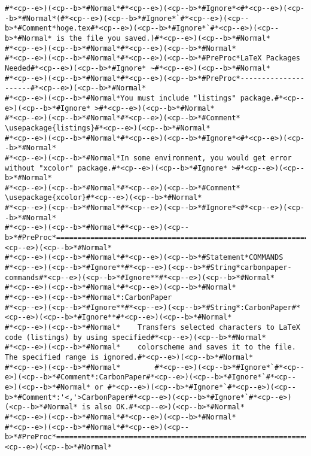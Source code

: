 \begin{lstlisting}[style=carbonpaper]
#*<cp--e>)(<cp--b>*#Normal*#*<cp--e>)(<cp--b>*#Ignore*<#*<cp--e>)(<cp--b>*#Normal*(#*<cp--e>)(<cp--b>*#Ignore*`#*<cp--e>)(<cp--b>*#Comment*hoge.tex#*<cp--e>)(<cp--b>*#Ignore*`#*<cp--e>)(<cp--b>*#Normal* is the file you saved.)#*<cp--e>)(<cp--b>*#Normal*
#*<cp--e>)(<cp--b>*#Normal*#*<cp--e>)(<cp--b>*#Normal*
#*<cp--e>)(<cp--b>*#Normal*#*<cp--e>)(<cp--b>*#PreProc*LaTeX Packages Needed#*<cp--e>)(<cp--b>*#Ignore* ~#*<cp--e>)(<cp--b>*#Normal*
#*<cp--e>)(<cp--b>*#Normal*#*<cp--e>)(<cp--b>*#PreProc*---------------------#*<cp--e>)(<cp--b>*#Normal*
#*<cp--e>)(<cp--b>*#Normal*You must include "listings" package.#*<cp--e>)(<cp--b>*#Ignore* >#*<cp--e>)(<cp--b>*#Normal*
#*<cp--e>)(<cp--b>*#Normal*#*<cp--e>)(<cp--b>*#Comment*    \usepackage{listings}#*<cp--e>)(<cp--b>*#Normal*
#*<cp--e>)(<cp--b>*#Normal*#*<cp--e>)(<cp--b>*#Ignore*<#*<cp--e>)(<cp--b>*#Normal*
#*<cp--e>)(<cp--b>*#Normal*In some environment, you would get error without "xcolor" package.#*<cp--e>)(<cp--b>*#Ignore* >#*<cp--e>)(<cp--b>*#Normal*
#*<cp--e>)(<cp--b>*#Normal*#*<cp--e>)(<cp--b>*#Comment*    \usepackage{xcolor}#*<cp--e>)(<cp--b>*#Normal*
#*<cp--e>)(<cp--b>*#Normal*#*<cp--e>)(<cp--b>*#Ignore*<#*<cp--e>)(<cp--b>*#Normal*
#*<cp--e>)(<cp--b>*#Normal*#*<cp--e>)(<cp--b>*#PreProc*==============================================================================#*<cp--e>)(<cp--b>*#Normal*
#*<cp--e>)(<cp--b>*#Normal*#*<cp--e>)(<cp--b>*#Statement*COMMANDS                                                #*<cp--e>)(<cp--b>*#Ignore**#*<cp--e>)(<cp--b>*#String*carbonpaper-commands#*<cp--e>)(<cp--b>*#Ignore**#*<cp--e>)(<cp--b>*#Normal*
#*<cp--e>)(<cp--b>*#Normal*#*<cp--e>)(<cp--b>*#Normal*
#*<cp--e>)(<cp--b>*#Normal*:CarbonPaper                                                    #*<cp--e>)(<cp--b>*#Ignore**#*<cp--e>)(<cp--b>*#String*:CarbonPaper#*<cp--e>)(<cp--b>*#Ignore**#*<cp--e>)(<cp--b>*#Normal*
#*<cp--e>)(<cp--b>*#Normal*    Transfers selected characters to LaTeX code (listings) by using specified#*<cp--e>)(<cp--b>*#Normal*
#*<cp--e>)(<cp--b>*#Normal*    colorscheme and saves it to the file.  The specified range is ignored.#*<cp--e>)(<cp--b>*#Normal*
#*<cp--e>)(<cp--b>*#Normal*        #*<cp--e>)(<cp--b>*#Ignore*`#*<cp--e>)(<cp--b>*#Comment*:CarbonPaper#*<cp--e>)(<cp--b>*#Ignore*`#*<cp--e>)(<cp--b>*#Normal* or #*<cp--e>)(<cp--b>*#Ignore*`#*<cp--e>)(<cp--b>*#Comment*:'<,'>CarbonPaper#*<cp--e>)(<cp--b>*#Ignore*`#*<cp--e>)(<cp--b>*#Normal* is also OK.#*<cp--e>)(<cp--b>*#Normal*
#*<cp--e>)(<cp--b>*#Normal*#*<cp--e>)(<cp--b>*#Normal*
#*<cp--e>)(<cp--b>*#Normal*#*<cp--e>)(<cp--b>*#PreProc*==============================================================================#*<cp--e>)(<cp--b>*#Normal*

\end{lstlisting}
